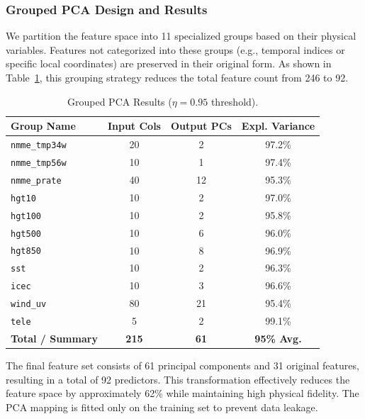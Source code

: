 \subsubsection{Grouped PCA Design and Results}

We partition the feature space into 11 specialized groups based on their physical variables. Features not categorized into these groups (e.g., temporal indices or specific local coordinates) are preserved in their original form. As shown in Table~\ref{tab:pca_results}, this grouping strategy reduces the total feature count from 246 to 92.

\begin{table}[htbp]
  \centering
  \caption{Grouped PCA Results ($\eta = 0.95$ threshold).}
  \label{tab:pca_results}
  \begin{tabular}{lccc}
    \toprule
    Group Name & Input Cols & Output PCs & Expl. Variance \\
    \midrule
    \texttt{nmme\_tmp34w} & 20  & 2  & 97.2\% \\
    \texttt{nmme\_tmp56w} & 10  & 1  & 97.4\% \\
    \texttt{nmme\_prate}  & 40  & 12 & 95.3\% \\
    \texttt{hgt10}        & 10  & 2  & 97.0\% \\
    \texttt{hgt100}       & 10  & 2  & 95.8\% \\
    \texttt{hgt500}       & 10  & 6  & 96.0\% \\
    \texttt{hgt850}       & 10  & 8  & 96.9\% \\
    \texttt{sst}          & 10  & 2  & 96.3\% \\
    \texttt{icec}         & 10  & 3  & 96.6\% \\
    \texttt{wind\_uv}      & 80  & 21 & 95.4\% \\
    \texttt{tele}         & 5   & 2  & 99.1\% \\
    \midrule
    \textbf{Total / Summary} & \textbf{215} & \textbf{61} & \textbf{95\% Avg.} \\
    \bottomrule
  \end{tabular}
\end{table}

The final feature set consists of 61 principal components and 31 original features, resulting in a total of 92 predictors. This transformation effectively reduces the feature space by approximately 62\% while maintaining high physical fidelity. The PCA mapping is fitted only on the training set to prevent data leakage.

